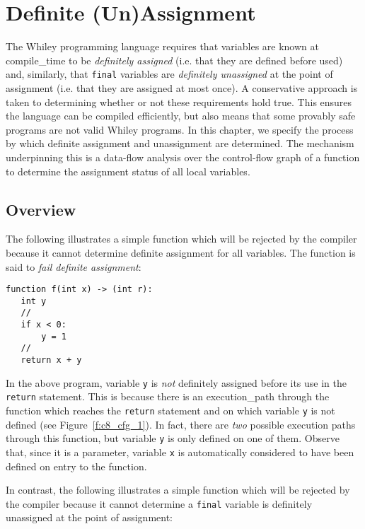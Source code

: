\chapter{Definite (Un)Assignment}
\label{c_definite_assignment}

The Whiley programming language requires that variables are known at
\gls{compile_time} to be {\em definitely assigned} (i.e. that they are
defined before used) and, similarly, that \lstinline{final} variables
are {\em definitely unassigned} at the point of assignment (i.e. that
they are assigned at most once).  A conservative approach is taken to
determining whether or not these requirements hold true.  This ensures
the language can be compiled efficiently, but also means that some
provably safe programs are not valid Whiley programs.  In this
chapter, we specify the process by which definite assignment and
unassignment are determined.  The mechanism underpinning this is a
data-flow analysis over the control-flow graph of a function to
determine the assignment status of all local variables.

\section{Overview}

The following illustrates a simple function which will be rejected by
the compiler because it cannot determine definite assignment for all
variables.  The function is said to {\em fail definite assignment}:

\begin{lstlisting}
function f(int x) -> (int r):
   int y
   //
   if x < 0:
       y = 1
   //
   return x + y
\end{lstlisting}

In the above program, variable \lstinline{y} is {\em not} definitely
assigned before its use in the \lstinline{return} statement.  This is
because there is an \gls{execution_path} through the function which
reaches the \lstinline{return} statement and on which variable
\lstinline{y} is not defined (see Figure~\ref{f:c8_cfg_1}).  In fact,
there are {\em two} possible execution paths through this function,
but variable \lstinline{y} is only defined on one of them.  Observe
that, since it is a parameter, variable \lstinline{x} is automatically
considered to have been defined on entry to the function.

In contrast, the following illustrates a simple function which will be
rejected by the compiler because it cannot determine a
\lstinline{final} variable is definitely unassigned at the point of
assignment:

